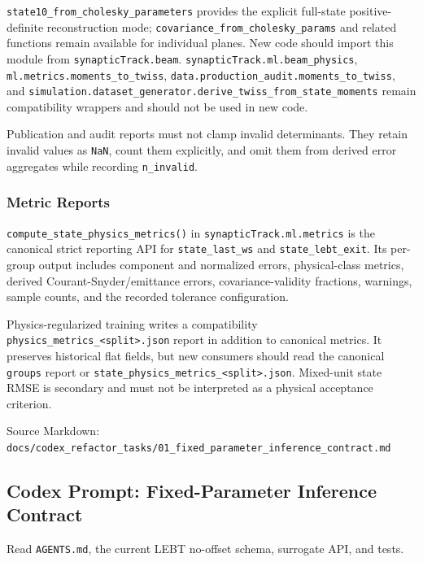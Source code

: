 \documentclass[
]{article}
\begin{document}
\texttt{state10\_from\_cholesky\_parameters} provides the explicit
full-state positive-definite reconstruction mode;
\texttt{covariance\_from\_cholesky\_params} and related functions remain
available for individual planes. New code should import this module from
\texttt{synapticTrack.beam}. \texttt{synapticTrack.ml.beam\_physics},
\texttt{ml.metrics.moments\_to\_twiss},
\texttt{data.production\_audit.moments\_to\_twiss}, and
\texttt{simulation.dataset\_generator.derive\_twiss\_from\_state\_moments}
remain compatibility wrappers and should not be used in new code.

Publication and audit reports must not clamp invalid determinants. They
retain invalid values as \texttt{NaN}, count them explicitly, and omit
them from derived error aggregates while recording \texttt{n\_invalid}.

\hypertarget{metric-reports}{%
\subsubsection{Metric Reports}\label{metric-reports}}

\texttt{compute\_state\_physics\_metrics()} in
\texttt{synapticTrack.ml.metrics} is the canonical strict reporting API
for \texttt{state\_last\_ws} and \texttt{state\_lebt\_exit}. Its
per-group output includes component and normalized errors,
physical-class metrics, derived Courant-Snyder/emittance errors,
covariance-validity fractions, warnings, sample counts, and the recorded
tolerance configuration.

Physics-regularized training writes a compatibility
\texttt{physics\_metrics\_\textless{}split\textgreater{}.json} report in
addition to canonical metrics. It preserves historical flat fields, but
new consumers should read the canonical \texttt{groups} report or
\texttt{state\_physics\_metrics\_\textless{}split\textgreater{}.json}.
Mixed-unit state RMSE is secondary and must not be interpreted as a
physical acceptance criterion.

Source Markdown:
\texttt{docs/codex\_refactor\_tasks/01\_fixed\_parameter\_inference\_contract.md}

\hypertarget{codex-prompt-fixed-parameter-inference-contract}{%
\subsection{Codex Prompt: Fixed-Parameter Inference
Contract}\label{codex-prompt-fixed-parameter-inference-contract}}

Read \texttt{AGENTS.md}, the current LEBT no-offset schema, surrogate
API, and tests.
\end{document}
